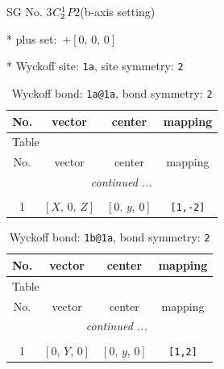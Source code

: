 \documentclass[fleqn,8pt]{jsarticle}
\begin{document}
\setcounter{MaxMatrixCols}{32}

\renewcommand{\tablename}{Table~}
\renewcommand{\figurename}{Figure~}
\begin{center}
\LARGE
SG No. 3\quad$C_{\rm 2}^{1}$\quad$P2$\quad(b-axis setting)\quad[ monoclinic ]
\end{center}

* plus set:\,\,\,$+\left[ 0,\, 0,\, 0 \right]$


* Wyckoff site: {\tt 1a}, site symmetry: {\tt 2}
\renewcommand{\arraystretch}{1.2}
\begin{longtable}{cccc}
\caption{Wyckoff bond: {\tt 1a@1a}, bond symmetry: {\tt 2}}
 \\
 \hline \hline
No. & vector & center & mapping \\ \hline \endfirsthead

\multicolumn{3}{l}{\tablename\ \thetable{}} \\
 \hline \hline
No. & vector & center & mapping \\ \hline \endhead

 \hline \hline
\multicolumn{3}{r}{\footnotesize\it continued ...} \\ \endfoot

 \hline \hline
\multicolumn{3}{r}{} \\ \endlastfoot

1 & $\left[ X,\, 0,\, Z \right]$ & $\left[ 0,\, y,\, 0 \right]$ & {\tt [1,-2]} \\
\end{longtable}
\renewcommand{\arraystretch}{1.2}
\begin{longtable}{cccc}
\caption{Wyckoff bond: {\tt 1b@1a}, bond symmetry: {\tt 2}}
 \\
 \hline \hline
No. & vector & center & mapping \\ \hline \endfirsthead

\multicolumn{3}{l}{\tablename\ \thetable{}} \\
 \hline \hline
No. & vector & center & mapping \\ \hline \endhead

 \hline \hline
\multicolumn{3}{r}{\footnotesize\it continued ...} \\ \endfoot

 \hline \hline
\multicolumn{3}{r}{} \\ \endlastfoot

1 & $\left[ 0,\, Y,\, 0 \right]$ & $\left[ 0,\, y,\, 0 \right]$ & {\tt [1,2]} \\
\end{longtable}
\end{document}

